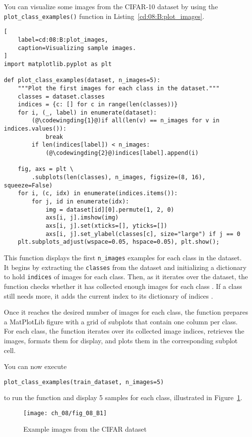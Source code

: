 You can visualize some images from the CIFAR-10 dataset by using the \lstinline{plot_class_examples()} function in Listing~\ref{cd:08:B:plot_images}.
\begin{lstlisting}[
    label=cd:08:B:plot_images,
    caption=Visualizing sample images.
]
import matplotlib.pyplot as plt

def plot_class_examples(dataset, n_images=5):
    """Plot the first images for each class in the dataset."""
    classes = dataset.classes
    indices = {c: [] for c in range(len(classes))}
    for i, (_, label) in enumerate(dataset):
        (@\codewingding{1}@)if all(len(v) == n_images for v in indices.values()):
            break
        if len(indices[label]) < n_images:
            (@\codewingding{2}@)indices[label].append(i)

    fig, axs = plt \
        .subplots(len(classes), n_images, figsize=(8, 16), squeeze=False)
    for i, (c, idx) in enumerate(indices.items()):
        for j, id in enumerate(idx):
            img = dataset[id][0].permute(1, 2, 0)
            axs[i, j].imshow(img)
            axs[i, j].set(xticks=[], yticks=[])
            axs[i, j].set_ylabel(classes[c], size="large") if j == 0
    plt.subplots_adjust(wspace=0.05, hspace=0.05), plt.show();
\end{lstlisting}
This function displays the first  \lstinline{n_images} examples for each class in the dataset.
It begins by extracting the \lstinline{classes} from the dataset and initializing a dictionary to hold \lstinline{indices} of images for each class.  Then, as it iterates over the dataset, the function checks whether it has collected enough images for each class . If a class still needs more, it adds the current index to its dictionary of indices . 

Once it reaches the desired number of images for each class, the function prepares a MatPlotLib figure with a grid of subplots that contain one column per class. 
For each class, the function iterates over its collected image indices, retrieves the images, formats them for display, and plots them in the corresponding subplot cell.

You can now execute
\begin{lstlisting}
plot_class_examples(train_dataset, n_images=5)
\end{lstlisting} 
to run the function and display 5 samples for each class, illustrated in Figure~\ref{fig:08:B:CIFAR}.

\begin{figure}[H]
    \texttt{[image: ch\_08/fig\_08\_B1]}
    \caption{Example images from the CIFAR dataset}
    \label{fig:08:B:CIFAR}
\end{figure}


